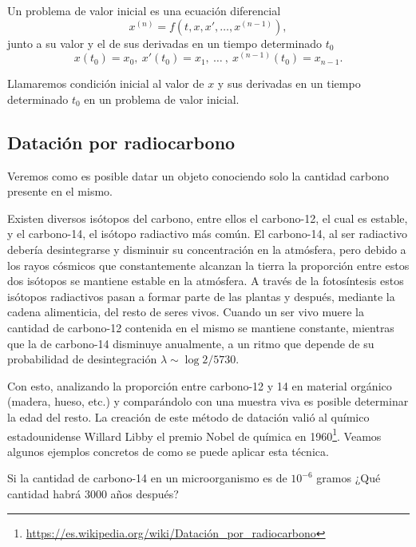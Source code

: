 \documentclass[../ecuaciones_diferenciales.tex]{subfiles}
\begin{document}
\begin{definition}
	Un problema de valor inicial es una ecuación diferencial
	\[x^{(n)} = f(t, x, x', \dots, x^{(n - 1)}),\]
	junto a su valor y el de sus derivadas en un tiempo determinado \(t_0\)
	\[x(t_0) = x_0,\ x'(t_0) = x_1,\ \dots\ ,\ x^{(n - 1)}(t_0) = x_{n - 1}.\]
\end{definition}

\begin{definition}
	Llamaremos condición inicial al valor de \(x\) y sus derivadas en un tiempo
	determinado \(t_0\) en un problema de valor inicial.
\end{definition}

\subsection{Datación por radiocarbono}

Veremos como es posible datar un objeto conociendo solo la cantidad carbono 
presente en el mismo.

Existen diversos isótopos del carbono, entre ellos el carbono-12, el cual es
estable, y el carbono-14, el isótopo radiactivo más común. El carbono-14, al ser
radiactivo debería desintegrarse y disminuir su concentración en la atmósfera,
pero debido a los rayos cósmicos que constantemente alcanzan la tierra la
proporción entre estos dos isótopos se mantiene estable en la atmósfera. A
través de la fotosíntesis estos isótopos radiactivos pasan a formar parte de las
plantas y después, mediante la cadena alimenticia, del resto de seres vivos.
Cuando un ser vivo muere la cantidad de carbono-12 contenida en el mismo se
mantiene constante, mientras que la de carbono-14 disminuye anualmente,
a un ritmo que depende de su probabilidad de desintegración
\(\lambda \sim \log 2 / 5730\).

Con esto, analizando la proporción entre carbono-12 y 14 en
material orgánico (madera, hueso, etc.) y comparándolo con una muestra viva es 
posible determinar la edad del resto. La creación de este método de
datación valió al químico estadounidense Willard Libby el premio Nobel de
química en
1960\footnote{\url{https://es.wikipedia.org/wiki/Datación_por_radiocarbono}}.
Veamos algunos ejemplos concretos de como se puede aplicar esta
técnica.

\begin{example}
	Si la cantidad de carbono-14 en un microorganismo es de \(10^{-6}\) gramos
	¿Qué cantidad habrá 3000 años después?
\end{example}
\end{document}
